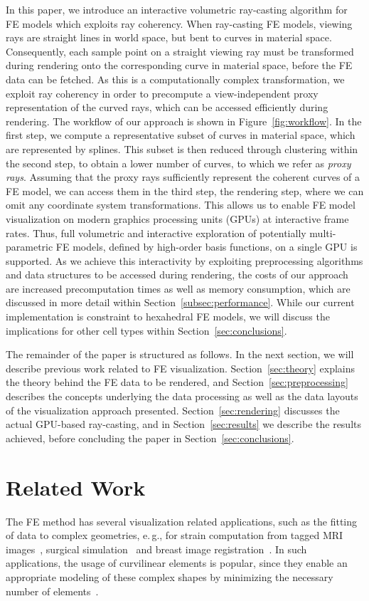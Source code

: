 \documentclass[journal]{vgtc}                %
\begin{document}
In this paper, we introduce an interactive volumetric ray-casting algorithm for FE models which exploits ray coherency. When ray-casting FE models, viewing rays are straight lines in world space, but bent to curves in material space. Consequently, each sample point on a straight viewing ray must be transformed during rendering onto the corresponding curve in material space, before the FE data can be fetched. As this is a computationally complex transformation, we exploit ray coherency in order to precompute a view-independent proxy representation of the curved rays, which can be accessed efficiently during rendering. The workflow of our approach is shown in Figure~\ref{fig:workflow}. In the first step, we compute a representative subset of curves in material space, which are represented by splines. This subset is then reduced through clustering within the second step, to obtain a lower number of curves, to which we refer as \emph{proxy rays}. Assuming that the proxy rays sufficiently represent the coherent curves of a FE model, we can access them in the third step, the rendering step, where we can omit any coordinate system transformations. This allows us to enable FE model visualization on modern graphics processing units (GPUs) at interactive frame rates. Thus, full volumetric and interactive exploration of potentially multi-parametric FE models, defined by high-order basis functions, on a single GPU is supported. As we achieve this interactivity by exploiting preprocessing algorithms and data structures to be accessed during rendering, the costs of our approach are increased precomputation times as well as memory consumption, which are discussed in more detail within Section~\ref{subsec:performance}. While our current implementation is constraint to hexahedral FE models, we will discuss the implications for other cell types within Section~\ref{sec:conclusions}.

The remainder of the paper is structured as follows. In the next section, we will describe previous work related to FE visualization. Section~\ref{sec:theory} explains the theory behind the FE data to be rendered, and Section~\ref{sec:preprocessing} describes the concepts underlying the data processing as well as the data layouts of the visualization approach presented. Section~\ref{sec:rendering} discusses the actual GPU-based ray-casting, and in Section~\ref{sec:results} we describe the results achieved, before concluding the paper in Section~\ref{sec:conclusions}.



\section{Related Work}\label{sec:relatedwork}
The FE method has several visualization related applications, such as the fitting of data to complex geometries, e.\,g., for strain computation from tagged MRI images~\cite{Young00}, surgical simulation~\cite{Berkley04} and breast image registration~\cite{lee10deformation}. In such applications, the usage of curvilinear elements is popular, since they enable an appropriate modeling of these complex shapes by minimizing the necessary number of elements~\cite{gelberg90visTechGrid,smith05ventricularmechanics}.
\end{document}
